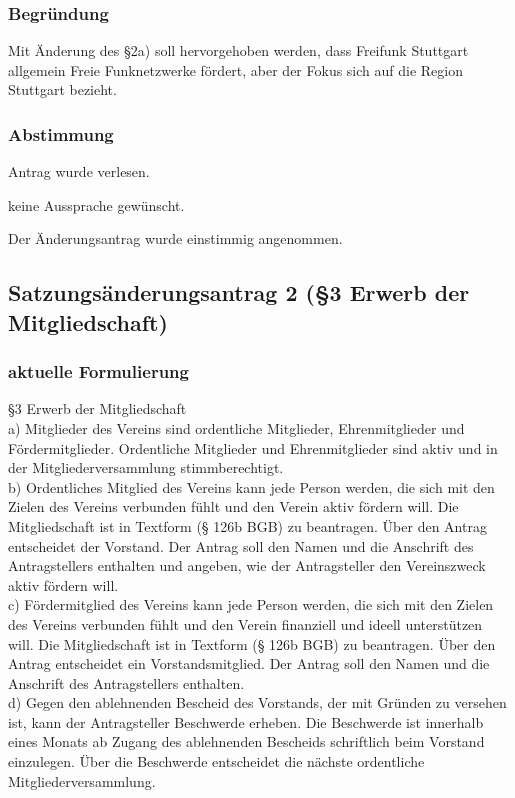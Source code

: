 \documentclass[a4paper]{scrartcl}
\begin{document}
\subsubsection{Begründung}

Mit Änderung des §2a) soll hervorgehoben werden, dass Freifunk Stuttgart allgemein Freie Funknetzwerke fördert, aber der Fokus sich auf die Region Stuttgart bezieht.

\subsubsection{Abstimmung}

Antrag wurde verlesen.

keine Aussprache gewünscht.

Der Änderungsantrag wurde einstimmig angenommen.

\clearpage
\subsection{Satzungsänderungsantrag 2 (§3 Erwerb der Mitgliedschaft)}

\subsubsection{aktuelle Formulierung}

§3 Erwerb der Mitgliedschaft\\
a) Mitglieder des Vereins sind ordentliche Mitglieder, Ehrenmitglieder und Fördermitglieder. Ordentliche Mitglieder und Ehrenmitglieder sind aktiv und in der Mitgliederversammlung stimmberechtigt.\\
b) Ordentliches Mitglied des Vereins kann jede Person werden, die sich mit den Zielen des Vereins verbunden fühlt und den Verein aktiv fördern will. Die Mitgliedschaft ist in Textform (§ 126b BGB) zu beantragen. Über den Antrag entscheidet der Vorstand. Der Antrag soll den Namen und die Anschrift des Antragstellers enthalten und angeben, wie der Antragsteller den Vereinszweck aktiv fördern will.\\
c) Fördermitglied des Vereins kann jede Person werden, die sich mit den Zielen des Vereins verbunden fühlt und den Verein finanziell und ideell unterstützen will. Die Mitgliedschaft ist in Textform (§ 126b BGB) zu beantragen. Über den Antrag entscheidet ein Vorstandsmitglied. Der Antrag soll den Namen und die Anschrift des Antragstellers enthalten.\\
d) Gegen den ablehnenden Bescheid des Vorstands, der mit Gründen zu versehen ist, kann der Antragsteller Beschwerde erheben. Die Beschwerde ist innerhalb eines Monats ab Zugang des ablehnenden Bescheids schriftlich beim Vorstand einzulegen. Über die Beschwerde entscheidet die nächste ordentliche Mitgliederversammlung.\\
\end{document}
